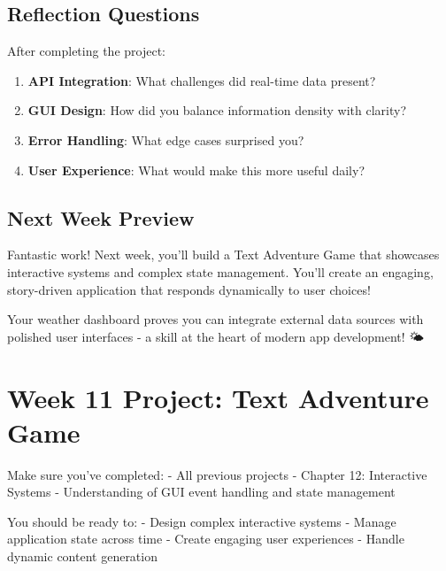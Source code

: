 \documentclass[
  letterpaper,
  DIV=11,
  numbers=noendperiod,
  oneside]{scrreprt}
\providecommand{\tightlist}{%
  \setlength{\itemsep}{0pt}\setlength{\parskip}{0pt}}\usepackage{longtable,booktabs,array}
\begin{document}
\section{Reflection Questions}\label{reflection-questions-9}

After completing the project:

\begin{enumerate}
\def\labelenumi{\arabic{enumi}.}
\tightlist
\item
  \textbf{API Integration}: What challenges did real-time data present?
\item
  \textbf{GUI Design}: How did you balance information density with
  clarity?
\item
  \textbf{Error Handling}: What edge cases surprised you?
\item
  \textbf{User Experience}: What would make this more useful daily?
\end{enumerate}

\section{Next Week Preview}\label{next-week-preview-7}

Fantastic work! Next week, you'll build a Text Adventure Game that
showcases interactive systems and complex state management. You'll
create an engaging, story-driven application that responds dynamically
to user choices!

Your weather dashboard proves you can integrate external data sources
with polished user interfaces - a skill at the heart of modern app
development! 🌤️

\chapter{Week 11 Project: Text Adventure
Game}\label{sec-project-text-adventure}

\begin{tcolorbox}[enhanced jigsaw, opacityback=0, colback=white, colframe=quarto-callout-important-color-frame, breakable, titlerule=0mm, coltitle=black, rightrule=.15mm, colbacktitle=quarto-callout-important-color!10!white, left=2mm, bottomtitle=1mm, bottomrule=.15mm, title=\textcolor{quarto-callout-important-color}{\faExclamation}\hspace{0.5em}{Before You Start}, opacitybacktitle=0.6, toptitle=1mm, leftrule=.75mm, arc=.35mm, toprule=.15mm]

Make sure you've completed: - All previous projects - Chapter 12:
Interactive Systems - Understanding of GUI event handling and state
management

You should be ready to: - Design complex interactive systems - Manage
application state across time - Create engaging user experiences -
Handle dynamic content generation

\end{tcolorbox}
\end{document}
